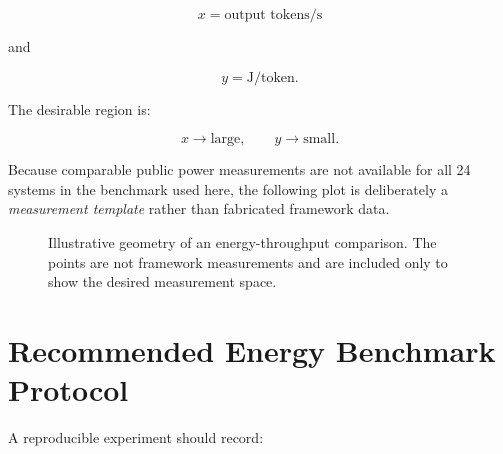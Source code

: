 \documentclass[11pt,a4paper]{article}
\begin{document}
\[
x=\text{output tokens/s}
\]

and

\[
y=\mathrm{J/token}.
\]

The desirable region is:

\[
\boxed{
x\rightarrow\text{large},
\qquad
y\rightarrow\text{small}.
}
\]

Because comparable public power measurements are not available for
all 24 systems in the benchmark used here, the following plot is
deliberately a \emph{measurement template} rather than fabricated
framework data.

\begin{figure}[H]
\centering


\caption{
Illustrative geometry of an energy-throughput comparison.
The points are not framework measurements and are included only to
show the desired measurement space.
}
\end{figure}

\section{Recommended Energy Benchmark Protocol}

A reproducible experiment should record:
\end{document}
